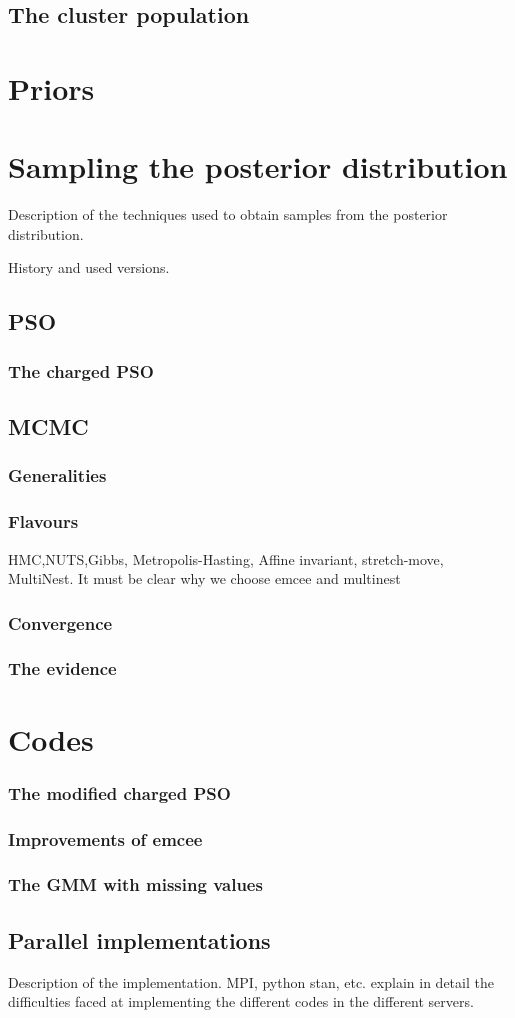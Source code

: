 \subsection{The cluster population}
\section{Priors}

\section{Sampling the posterior distribution}

Description of the techniques used to obtain samples from the posterior distribution.

History and used versions.

\subsection{PSO}
\subsubsection{The charged PSO}


\subsection{MCMC}
\subsubsection{Generalities}
\subsubsection{Flavours}
HMC,NUTS,Gibbs, Metropolis-Hasting, Affine invariant, stretch-move, MultiNest.
It must be clear why we choose emcee and multinest
\subsubsection{Convergence}
\subsubsection{The evidence}


\section{Codes}
\subsubsection{The modified charged PSO}
\subsubsection{Improvements of emcee}
\subsubsection{The GMM with missing values}
\subsection{Parallel implementations}
Description of the implementation. MPI, python stan, etc.
explain in detail the difficulties faced at implementing the different codes in the different servers.

